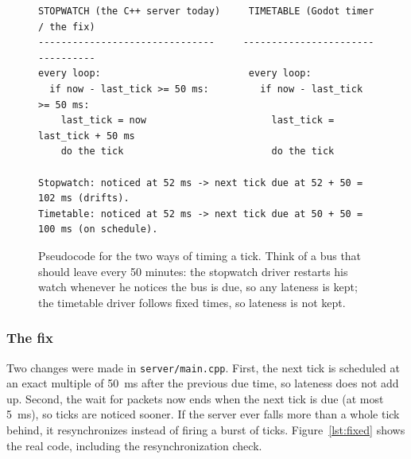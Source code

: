 \begin{figure}[H]
\begin{lstlisting}[language={}]
STOPWATCH (the C++ server today)     TIMETABLE (Godot timer / the fix)
-------------------------------     ---------------------------------
every loop:                          every loop:
  if now - last_tick >= 50 ms:         if now - last_tick >= 50 ms:
    last_tick = now                      last_tick = last_tick + 50 ms
    do the tick                          do the tick

Stopwatch: noticed at 52 ms -> next tick due at 52 + 50 = 102 ms (drifts).
Timetable: noticed at 52 ms -> next tick due at 50 + 50 = 100 ms (on schedule).
\end{lstlisting}
\caption{Pseudocode for the two ways of timing a tick. Think of a bus that should leave every 50 minutes: the stopwatch driver restarts his watch whenever he notices the bus is due, so any lateness is kept; the timetable driver follows fixed times, so lateness is not kept.}
\label{lst:pseudo}
\end{figure}

\subsubsection{The fix}
Two changes were made in \texttt{server/main.cpp}. First, the next tick is scheduled at an exact multiple of 50~ms after the previous due time, so lateness does not add up. Second, the wait for packets now ends when the next tick is due (at most 5~ms), so ticks are noticed sooner. If the server ever falls more than a whole tick behind, it resynchronizes instead of firing a burst of ticks. Figure~\ref{lst:fixed} shows the real code, including the resynchronization check.

